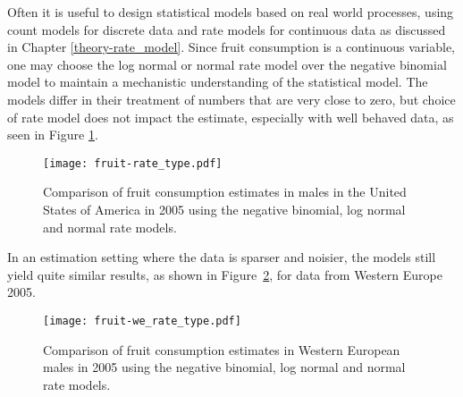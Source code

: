 Often it is useful to design statistical models based on real world
processes, using count models for discrete data and rate models for
continuous data as discussed in Chapter \ref{theory-rate_model}.
Since fruit consumption is a continuous variable, one may choose the
log normal or normal rate model over the negative binomial model to
maintain a mechanistic understanding of the statistical model.  The
models differ in their treatment of numbers that are very close to
zero, but choice of rate model does not impact the estimate,
especially with well behaved data, as seen in Figure
\ref{fig:app-fruit rate type}.

    \begin{figure}[h]
        \begin{center}
            \texttt{[image: fruit-rate\_type.pdf]}
            \caption{Comparison of fruit consumption estimates in
              males in the United States of America in 2005 using the
              negative binomial, log normal and normal rate models.}
            \label{fig:app-fruit rate type}
        \end{center}
    \end{figure}

In an estimation setting where the data is sparser and noisier, the
models still yield quite similar results, as shown in Figure~\ref{fig:app-fruit europe},
for data from Western Europe 2005.

    \begin{figure}[h]
        \begin{center}
            \texttt{[image: fruit-we\_rate\_type.pdf]}
            \caption{Comparison of fruit consumption estimates in
              Western European males in 2005 using the
              negative binomial, log normal and normal rate models.}
            \label{fig:app-fruit europe}
        \end{center}
    \end{figure}
